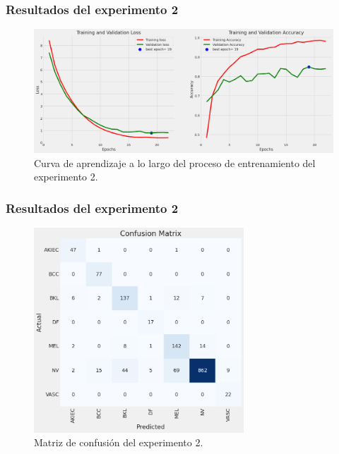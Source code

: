 \documentclass{beamer}
\begin{document}
\begin{frame}
  \frametitle{Resultados del experimento 2}

  \begin{figure}[H]
    \begin{center}
        \includegraphics[width=1\textwidth]{./Graphics/training&validation_p3.png}
        \caption{Curva de aprendizaje a lo largo del proceso de entrenamiento del experimento 2.}
    \end{center}
\end{figure}
\end{frame}


\begin{frame}
  \frametitle{Resultados del experimento 2}

  \begin{figure}[H]
    \begin{center}
        \includegraphics[width=0.7\textwidth]{./Graphics/confussionmatrix_p3.png}
        \caption{Matriz de confusión del experimento 2.}
    \end{center}
  \end{figure}

\end{frame}
\end{document}

